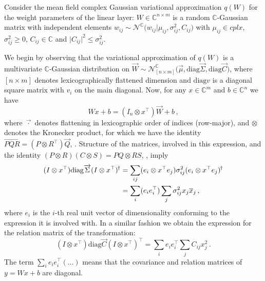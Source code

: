 \documentclass[a4paper,10pt]{article}
\newcommand{\cplx}{\mathbb{C}}
\newcommand{\hop}{{\mkern-1.5mu\dagger}}
\newcommand{\conj}[1]{\overline{#1}}
\renewcommand{\vec}[1]{\overrightarrow{#1}}
\newcommand{\diag}[1]{\mathrm{diag}{#1}}
\begin{document}
Consider the mean field complex Gaussian variational approximation $q(W)$ for the weight
parameters of the linear layer: $W \in \cplx^{n\times m}$ is a random $\cplx$-Gaussian
matrix with independent elements $
  w_{ij} \sim \mathcal{N}^{\cplx}\bigl(
    w_{ij}
    \big \vert
    \mu_{ij}, \sigma^2_{ij}, C_{ij}
  \bigr)
$ with $\mu_{ij}\in cplx$, $\sigma^2_{ij} \geq 0$, $C_{ij}\in \cplx$ and $
  \lvert C_{ij} \rvert^2 \leq \sigma^2_{ij}
$.

We begin by observing that the variational approximation of $q(W)$ is a multivariate
$\cplx$-Gaussian distribution on $
  \vec{W}
    \sim \mathcal{N}^{\cplx}_{[n\times m]} \bigl(
      \vec{\mu}, \diag{\vec{\Sigma}}, \diag{\vec{C}}
    \bigr)
$, where $[n\times m]$ denotes lexicographically flattened dimension and $\diag{v}$
is a diagonal square matrix with $v_i$ on the main diagonal. Now, for any $x \in \cplx^m$
and $b\in \cplx^n$ we have
$$
W x + b
  = (I_n \otimes x^\top) \vec{W} + b
  \,, $$
where $\vec{\cdot}$ denotes flattening in lexicographic order of indices (row-major),
and $\otimes$ denotes the Kronecker product, for which we have the identity $
  \vec{P Q R} = (P \otimes R^\top) \vec{Q}
$, \cite{petersen_matrix_2012}.
%
Structure of the matrices, involved in this expression, and the identity $
  (P \otimes R) (C \otimes S) = P Q \otimes R S
$, \cite{petersen_matrix_2012}, imply
\begin{align}
(I \otimes x^\top) \diag{\vec{\Sigma}} (I \otimes x^\top)^\hop
  &
  = \sum_{ij} (e_i \otimes x^\top e_j)
    \sigma^2_{ij} (e_i \otimes x^\top e_j)^\hop
  \notag \\
  &
  = \sum_i (e_i e_i^\top) \sum_j \sigma^2_{ij} x_j \conj{x}_j
  \,,
\end{align}
where $e_i$ is the $i$-th real unit vector of dimensionality conforming to the
expression it is involved with. In a similar fashion we obtain the expression
for the relation matrix of the transformation:
\begin{equation}
(I \otimes x^\top) \diag{\vec{C}} (I \otimes x^\top)^\top
  = \sum_i e_i e_i^\top \sum_j C_{ij} x_j^2
  \,.
\end{equation}
The term $
  \sum_i e_i e_i^\top (\ldots)
$ means that the covariance and relation matrices of $y = Wx + b$ are diagonal.
\end{document}
